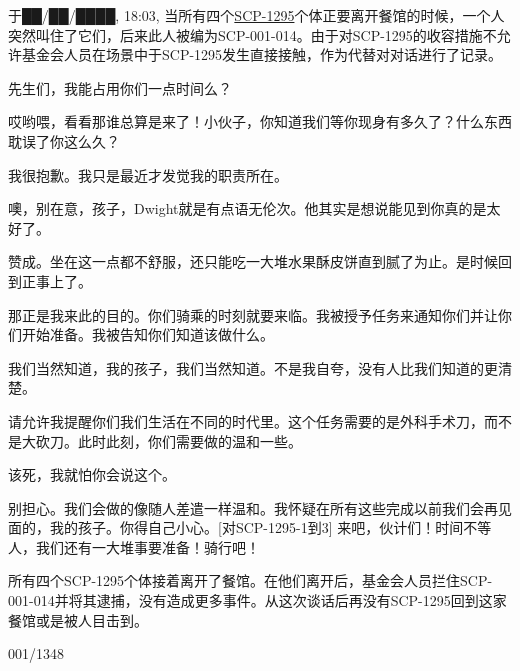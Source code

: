 \begin{scpbox}

于██/██/████, 18:03, 当所有四个\hyperref[chhap:SCP-1295]{SCP-1295}个体正要离开餐馆的时候，一个人突然叫住了它们，后来此人被编为SCP-001-014。由于对SCP-1295的收容措施不允许基金会人员在场景中于SCP-1295发生直接接触，作为代替对对话进行了记录。

\begin{scpbox}


 先生们，我能占用你们一点时间么？

 哎哟喂，看看那谁总算是来了！小伙子，你知道我们等你现身有多久了？什么东西耽误了你这么久？

 我很抱歉。我只是最近才发觉我的职责所在。

 噢，别在意，孩子，Dwight就是有点语无伦次。他其实是想说能见到你真的是太好了。

 赞成。坐在这一点都不舒服，还只能吃一大堆水果酥皮饼直到腻了为止。是时候回到正事上了。

 那正是我来此的目的。你们骑乘的时刻就要来临。我被授予任务来通知你们并让你们开始准备。我被告知你们知道该做什么。

 我们当然知道，我的孩子，我们当然知道。不是我自夸，没有人比我们知道的更清楚。

 请允许我提醒你们我们生活在不同的时代里。这个任务需要的是外科手术刀，而不是大砍刀。此时此刻，你们需要做的温和一些。

 该死，我就怕你会说这个。

 别担心。我们会做的像随人差遣一样温和。我怀疑在所有这些完成以前我们会再见面的，我的孩子。你得自己小心。[对SCP-1295-1到3] 来吧，伙计们！时间不等人，我们还有一大堆事要准备！骑行吧！


\end{scpbox}

所有四个SCP-1295个体接着离开了餐馆。在他们离开后，基金会人员拦住SCP-001-014并将其逮捕，没有造成更多事件。从这次谈话后再没有SCP-1295回到这家餐馆或是被人目击到。

\end{scpbox}

001/1348

